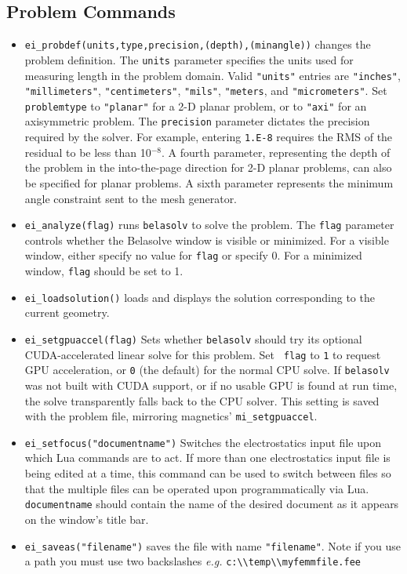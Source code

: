 \subsection{Problem Commands}

\begin{itemize}
\item {\tt ei\_probdef(units,type,precision,(depth),(minangle))} changes the problem
definition. The \texttt{units} parameter specifies the units used
for measuring length in the problem domain. Valid \texttt{"units"}
entries are
\texttt{"inches"}, \texttt{"millimeters"}, \texttt{"centimeters"},
\texttt{"mils"}, \texttt{"meters}, and \texttt{"micrometers"}. Set
\texttt{problemtype} to \texttt{"planar"} for a 2-D planar problem, or to
\texttt{"axi"} for an axisymmetric problem. The \texttt{precision} parameter
dictates the precision required by the solver. For example, entering
\texttt{1.E-8} requires the RMS of the residual to be less than 10$^{ - 8}$.
A fourth parameter, representing the depth of the problem in the
into-the-page direction for 2-D planar problems, can also be specified
for planar problems. A sixth parameter represents the minimum angle constraint sent to the mesh generator.

\item {\tt ei\_analyze(flag)} runs \texttt{belasolv} to solve the problem. The
\texttt{flag} parameter controls whether the Belasolve window is visible or
minimized. For a visible window, either specify no value for
\texttt{flag} or specify 0. For a minimized window, \texttt{flag}
should be set to 1.

\item {\tt ei\_loadsolution()} loads and displays the solution corresponding to the
current geometry.

\item{\tt ei\_setgpuaccel(flag)} Sets whether {\tt belasolv} should try
its optional CUDA-accelerated linear solve for this problem. Set {\tt
flag} to {\tt 1} to request GPU acceleration, or {\tt 0} (the default)
for the normal CPU solve. If {\tt belasolv} was not built with CUDA
support, or if no usable GPU is found at run time, the solve
transparently falls back to the CPU solver. This setting is saved with
the problem file, mirroring magnetics' {\tt mi\_setgpuaccel}.

\item {\tt ei\_setfocus("documentname")} Switches the
electrostatics input file upon which Lua commands are to act. If
more than one electrostatics input file is being edited at a time,
this command can be used to switch between files so that the
multiple files can be operated upon programmatically via Lua. {\tt
documentname} should contain the name of the desired document as
it appears on the window's title bar.

\item {\tt ei\_saveas("filename")} saves the file with name
\texttt{"filename"}. Note if you use a path you must use two backslashes
{\em e.g.} \verb+c:\\temp\\myfemmfile.fee+

\end{itemize}

